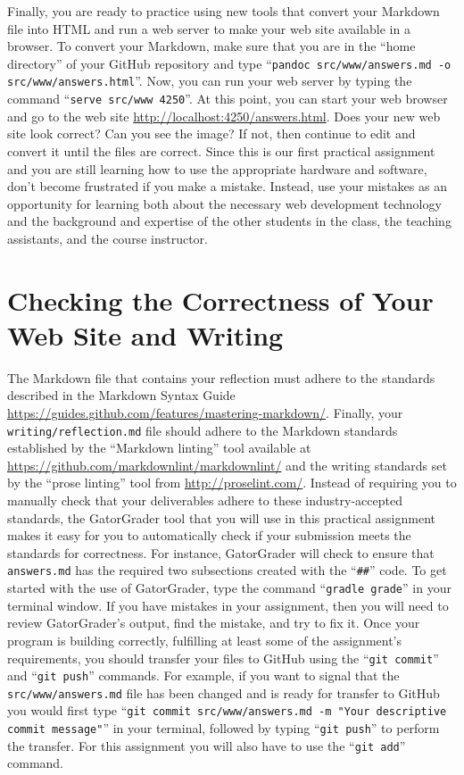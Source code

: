 \documentclass[11pt]{article}
\newcommand{\mainprogram}{\lstinline{answers.md}}
\newcommand{\mainprogramsource}{\lstinline{src/www/answers.md}}
\newcommand{\reflection}{\lstinline{writing/reflection.md}}
\newcommand{\gatorgraderstart}{\command{gradle grade}}
\newcommand{\gitadd}{\command{git add}}
\newcommand{\gitcommit}{\command{git commit}}
\newcommand{\gitpush}{\command{git push}}
\newcommand{\gitcommitmainprogram}{\command{git commit src/www/answers.md -m
"Your descriptive commit message"}}
\newcommand{\command}[1]{``\lstinline{#1}''}
\newcommand{\step}[1]{``{#1}''}
\begin{document}

Finally, you are ready to practice using new tools that convert your Markdown
file into HTML and run a web server to make your web site available in a
browser. To convert your Markdown, make sure that you are in the ``home
directory'' of your GitHub repository and type \command{pandoc
src/www/answers.md -o src/www/answers.html}. Now, you can run your web server by
typing the command \command{serve src/www 4250}. At this point, you can start
your web browser and go to the web site
\url{http://localhost:4250/answers.html}. Does your new web site look correct?
Can you see the image? If not, then continue to edit and convert it until the
files are correct. Since this is our first practical assignment and you are
still learning how to use the appropriate hardware and software, don't become
frustrated if you make a mistake. Instead, use your mistakes as an opportunity
for learning both about the necessary web development technology and the
background and expertise of the other students in the class, the teaching
assistants, and the course instructor.

\section*{Checking the Correctness of Your Web Site and Writing}

The Markdown file that contains your reflection must adhere to the standards
described in the Markdown Syntax Guide
\url{https://guides.github.com/features/mastering-markdown/}. Finally, your
\reflection{} file should adhere to the Markdown standards established by the
\step{Markdown linting} tool available at
\url{https://github.com/markdownlint/markdownlint/} and the writing standards
set by the \step{prose linting} tool from \url{http://proselint.com/}. Instead
of requiring you to manually check that your deliverables adhere to these
industry-accepted standards, the GatorGrader tool that you will use in this
practical assignment makes it easy for you to automatically check if your
submission meets the standards for correctness. For instance, GatorGrader will
check to ensure that \mainprogram{} has the required two subsections created
with the \command{##} code.
%
To get started with the use of GatorGrader, type the command \gatorgraderstart{}
in your terminal window. If you have mistakes in your assignment, then you will
need to review GatorGrader's output, find the mistake, and try to fix it. Once
your program is building correctly, fulfilling at least some of the assignment's
requirements, you should transfer your files to GitHub using the \gitcommit{}
and \gitpush{} commands. For example, if you want to signal that the
\mainprogramsource{} file has been changed and is ready for transfer to GitHub
you would first type \gitcommitmainprogram{} in your terminal, followed by
typing \gitpush{} to perform the transfer. For this assignment you will also
have to use the \gitadd{} command.
\end{document}
